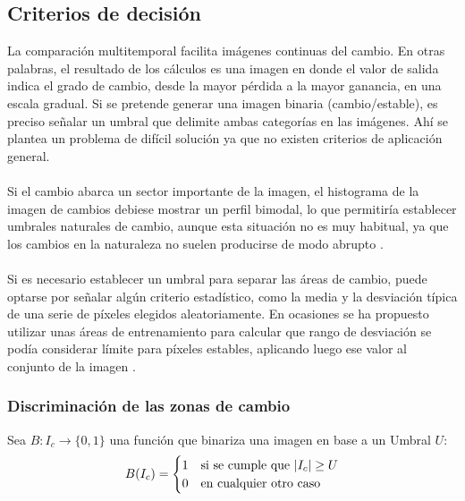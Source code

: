 \subsection{Criterios de decisi\'on}
La comparaci\'on multitemporal facilita im\'agenes continuas del cambio. En otras palabras, el resultado de los c\'alculos es una imagen en donde el valor de salida indica el grado de cambio, desde la mayor p\'erdida a la mayor ganancia, en una escala gradual. Si se pretende generar una imagen binaria (cambio/estable), es preciso se\~{n}alar un umbral que delimite ambas categor\'ias en las im\'agenes. Ah\'i se plantea un problema de dif\'icil soluci\'on ya que no existen criterios de aplicación general.\\~\\
Si el cambio abarca un sector importante de la imagen, el histograma de la imagen de cambios debiese mostrar un perfil bimodal, lo que permitir\'ia establecer umbrales naturales de cambio, aunque esta situaci\'on no es muy habitual, ya que los cambios en la naturaleza no suelen producirse de modo abrupto \cite{martinez2013normalizacion}.\\~\\
Si es necesario establecer un umbral para separar las \'areas de cambio, puede optarse por se\~{n}alar alg\'un criterio estad\'istico, como la media y la desviaci\'on t\'ipica de una serie de p\'ixeles elegidos aleatoriamente. En ocasiones se ha propuesto utilizar unas \'areas de entrenamiento para calcular que rango de desviaci\'on se pod\'ia considerar l\'imite para p\'ixeles estables, aplicando luego ese valor al conjunto de la imagen \cite{tung1988determination}.

\subsubsection{Discriminaci\'on de las zonas de cambio}\label{sec:discriminacion}
Sea $ B:I_{c} \longrightarrow \{0,1\}$ 	una funci\'on que binariza una imagen en base a un Umbral $ U $:
\begin{equation}\label{ec:umbralizacion}
B(I_{c}) = \begin{cases}
1 & \text{si se cumple que } \abs{I_c} \geq U \\
0 & \text{en cualquier otro caso}
\end{cases}
\end{equation}

